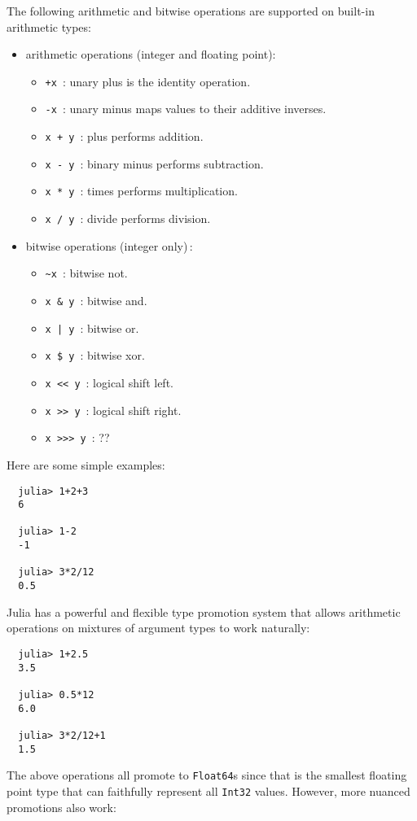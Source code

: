 \documentclass{article}
\begin{document}
The following arithmetic and bitwise operations are supported on built-in arithmetic types:
\begin{itemize}
  \item arithmetic operations (integer and floating point):
  \begin{itemize}
    \item \verb|+x|~: unary plus is the identity operation.
    \item \verb|-x|~: unary minus maps values to their additive inverses.
    \item \verb|x + y|~: plus performs addition.
    \item \verb|x - y|~: binary minus performs subtraction.
    \item \verb|x * y|~: times performs multiplication.
    \item \verb|x / y|~: divide performs division.
  \end{itemize}
  \item bitwise operations (integer only)\,:
  \begin{itemize}
    \item \verb|~x|~: bitwise not.
    \item \verb|x & y|~: bitwise and.
    \item \texttt{x | y}~: bitwise or.
    \item \verb|x $ y|~: bitwise xor.
    \item \verb|x << y|~: logical shift left.
    \item \verb|x >> y|~: logical shift right.
    \item \verb|x >>> y|~: ??
  \end{itemize}
\end{itemize}
Here are some simple examples:
\begin{verbatim}
  julia> 1+2+3
  6

  julia> 1-2
  -1

  julia> 3*2/12
  0.5
\end{verbatim}
Julia has a powerful and flexible type promotion system that allows arithmetic operations on mixtures of argument types to work naturally:
\begin{verbatim}
  julia> 1+2.5
  3.5

  julia> 0.5*12
  6.0

  julia> 3*2/12+1
  1.5
\end{verbatim}
The above operations all promote to \verb|Float64|s since that is the smallest floating point type that can faithfully represent all \verb|Int32| values.
However, more nuanced promotions also work:
\end{document}
